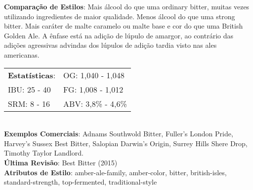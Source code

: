 \textbf{Comparação de Estilos}: Mais álcool do que uma ordinary bitter, muitas vezes utilizando ingredientes de maior qualidade. Menos álcool do que uma strong bitter. Mais caráter de malte caramelo ou malte base e cor do que uma British Golden Ale. A ênfase está na adição de lúpulo de amargor, ao contrário das adições agressivas advindas dos lúpulos de adição tardia visto nas ales americanas.\\
\begin{tabular}{@{}p{35mm}p{35mm}@{}}
  \textbf{Estatísticas}: & OG: 1,040 - 1,048 \\
  IBU: 25 - 40  & FG: 1,008 - 1,012  \\
  SRM: 8 - 16  & ABV: 3,8\% - 4,6\%
\end{tabular}\\
\textbf{Exemplos Comerciais}: Adnams Southwold Bitter, Fuller's London Pride, Harvey's Sussex Best Bitter, Salopian Darwin’s Origin, Surrey Hills Shere Drop, Timothy Taylor Landlord. \\
\textbf{Última Revisão}: Best Bitter (2015) \\
\textbf{Atributos de Estilo}: amber-ale-family, amber-color, bitter, british-isles, standard-strength, top-fermented, traditional-style
